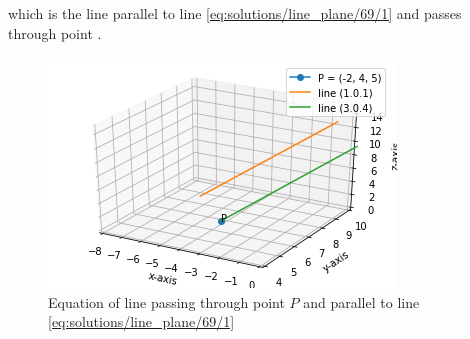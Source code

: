 which is the line parallel to line \eqref{eq:solutions/line_plane/69/1} and passes through point .
\begin{figure}[h]
    \centering
    \includegraphics[width=\columnwidth]{./solutions/line_plane/69/fig/figure.png}
    \caption{Equation of line passing through point $P$ and parallel to line \eqref{eq:solutions/line_plane/69/1}}
    \label{fig:}
\end{figure}

